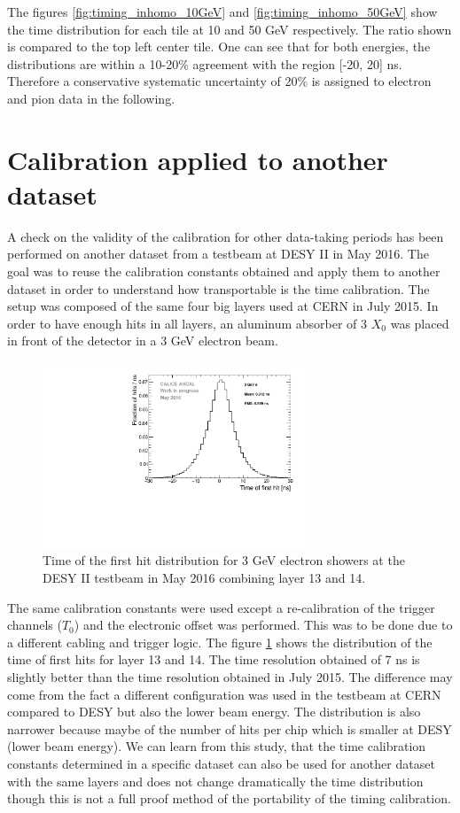 The figures \ref{fig:timing_inhomo_10GeV} and \ref{fig:timing_inhomo_50GeV} show the time distribution for each tile at 10 and 50 GeV respectively. The ratio shown is compared to the top left center tile. One can see that for both energies, the distributions are within a 10-20\% agreement with the region [-20, 20] ns. Therefore a conservative systematic uncertainty of 20\% is assigned to electron and pion data in the following.

\section{Calibration applied to another dataset}

A check on the validity of the calibration for other data-taking periods has been performed on another dataset from a testbeam at DESY II in May 2016. The goal was to reuse the calibration constants obtained and apply them to another dataset in order to understand how transportable is the time calibration. The setup was composed of the same four big layers used at CERN in July 2015. In order to have enough hits in all layers, an aluminum absorber of 3 $X_{0}$ was placed in front of the detector in a 3 GeV electron beam.

\begin{figure}[htbp!]
	\centering
	\includegraphics[width=0.7\textwidth]{../Thesis_Plots/Timing/Electrons/Plots/Timing_May2016_BigLayers.pdf}
	\caption{Time of the first hit distribution for 3 GeV electron showers at the DESY II testbeam in May 2016 combining layer 13 and 14.}\label{fig:TBMay2016}
\end{figure}

The same calibration constants were used except a re-calibration of the trigger channels ($T_{0}$) and the electronic offset was performed. This was to be done due to a different cabling and trigger logic. The figure \ref{fig:TBMay2016} shows the distribution of the time of first hits for layer 13 and 14. The time resolution obtained of 7 ns is slightly better than the time resolution obtained in July 2015. The difference may come from the fact a different configuration was used in the testbeam at CERN compared to DESY but also the lower beam energy. The distribution is also narrower because maybe of the number of hits per chip which is smaller at DESY (lower beam energy). We can learn from this study, that the time calibration constants determined in a specific dataset can also be used for another dataset with the same layers and does not change dramatically the time distribution though this is not a full proof method of the portability of the timing calibration.


